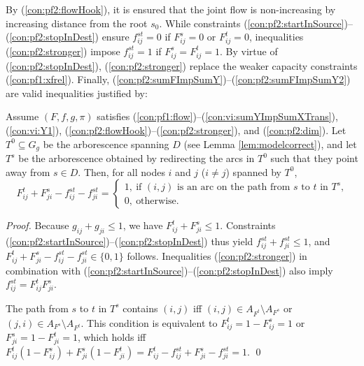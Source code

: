 By (\ref{con:pf2:flowHook}), it is ensured that the joint flow is non-increasing by increasing distance from the root $s_0$.
While constraints (\ref{con:pf2:startInSource})--(\ref{con:pf2:stopInDest}) ensure $f_{ij}^{st}=0$ if $F_{ij}^s=0$ or $F_{ij}^t=0$,
inequalities (\ref{con:pf2:stronger}) impose $f_{ij}^{st}=1$ if $F_{ij}^s=F_{ij}^t=1$.
By virtue of (\ref{con:pf2:stopInDest}), (\ref{con:pf2:stronger}) replace the weaker capacity constraints (\ref{con:pf1:xfrel}).
Finally, (\ref{con:pf2:sumFImpSumY})--(\ref{con:pf2:sumFImpSumY2}) are valid inequalities justified by:
\begin{prop}\label{prop:transX}
Assume $(F,f,g,\pi)$ satisfies (\ref{con:pf1:flow})--(\ref{con:vi:sumYImpSumXTrans}), (\ref{con:vi:Y1}), (\ref{con:pf2:flowHook})--(\ref{con:pf2:stronger}), and (\ref{con:pf2:dim}).
Let $T^0\subseteq G_g$ be the arborescence spanning $D$ (see Lemma \ref{lem:modelcorrect}),
and let $T^s$ be the arborescence obtained by redirecting the arcs in $T^0$ such that they point away from $s\in D$. Then, for all nodes $i$ and $j$ ($i\neq j$) spanned by $T^0$,
$$
F^t_{ij}+F^s_{ji}-f^{st}_{ij}-f^{st}_{ji} = 
	\begin{cases}
		1, ~\text{if $(i,j)$ is an arc on the path from~$s$ to $t$ in $T^s$,} \\
		0, ~\text{otherwise.}
	\end{cases}
$$
\end{prop}
%
\begin{proof}
Because $g_{ij}+g_{ji}\leq 1$, we have $F^t_{ij}+F^s_{ji}\leq 1$.
Constraints (\ref{con:pf2:startInSource})--(\ref{con:pf2:stopInDest}) thus yield $f^{st}_{ij}+f^{st}_{ji}\leq 1$, and
$F^t_{ij}+F^s_{ji}-f^{st}_{ij}-f^{st}_{ji}\in \{0,1\}$ follows.
Inequalities (\ref{con:pf2:stronger}) in combination with (\ref{con:pf2:startInSource})--(\ref{con:pf2:stopInDest}) also imply $f^{st}_{ij}=F^t_{ij}F^s_{ji}$.

The path from $s$ to $t$ in $T^s$ contains $(i,j)$ iff $(i,j)\in A_{F^t}\setminus A_{F^s}$ or $(j,i)\in A_{F^s}\setminus A_{F^t}$.
This condition is equivalent to $F_{ij}^t=1-F_{ij}^s=1$ or $F_{ji}^s=1-F_{ji}^t=1$,
which holds iff $F_{ij}^t(1-F_{ij}^s)+F_{ji}^s(1-F_{ji}^t)=F_{ij}^t-f_{ij}^{st}+F_{ji}^s-f_{ji}^{st}=1$.
\qed
\end{proof}


